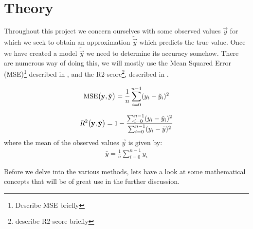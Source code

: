 \section{Theory}\label{sec:theroy}



Throughout this project we concern ourselves with some observed values $\vec{y}$ for which we seek to obtain an approximation $\tilde{\vec{y}}$ which predicts the true value. Once we have created a model $\tilde{\vec{y}}$ we need to determine its accuracy somehow. There are numerous way of doing this, we will mostly use the Mean Squared Error (MSE)\footnote{Describe MSE briefly} described in , and the R2-score\footnote{describe R2-score briefly}, described in .


\begin{align}\label{eq:MSE}
    \text{MSE}\big(\mathbf{y}, \tilde{\mathbf{y}}\big)= \frac{1}{n}\sum_{i=0}^{n-1} (y_i - \tilde{y}_i)^2
\end{align}

\begin{align}\label{eq:R2}
    R^2\big(\mathbf{y}, \tilde{\mathbf{y}}\big) = 1 - \frac{\sum_{i=0}^{n-1}(y_i-\tilde{y}_i)^2}{\sum_{i=0}^{n-1}(y_i-\bar{y})^2}
\end{align}
where the mean of the observed values $\vec{y}$ is given by:
\begin{align*}
    \bar{y} = \frac{1}{n}\sum_{i=0}^{n-1} y_i
\end{align*}


Before we delve into the various methods, lets have a look at some mathematical concepts that will be of great use in the further discussion. 

